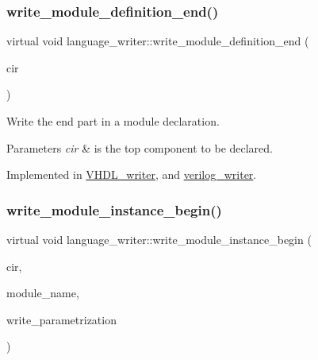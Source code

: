 \subsubsection{\texorpdfstring{write\+\_\+module\+\_\+definition\+\_\+end()}{write\_module\_definition\_end()}}
{\footnotesize\ttfamily virtual void language\+\_\+writer\+::write\+\_\+module\+\_\+definition\+\_\+end (\begin{DoxyParamCaption}\item[{const \hyperlink{structural__objects_8hpp_a8ea5f8cc50ab8f4c31e2751074ff60b2}{structural\+\_\+object\+Ref} \&}]{cir }\end{DoxyParamCaption})\hspace{0.3cm}{\ttfamily [pure virtual]}}



Write the end part in a module declaration. 


\begin{DoxyParams}{Parameters}
{\em cir} & is the top component to be declared. \\
\hline
\end{DoxyParams}


Implemented in \hyperlink{structVHDL__writer_af09ad7bcc11cb6cbcc0d92957db60283}{V\+H\+D\+L\+\_\+writer}, and \hyperlink{classverilog__writer_aeb32328c5b805c13c4fc86a5576e82d4}{verilog\+\_\+writer}.

\mbox{\label{classlanguage__writer_a9fa5dba07a53f84fb2936c0c46a511a4}} 
\subsubsection{\texorpdfstring{write\+\_\+module\+\_\+instance\+\_\+begin()}{write\_module\_instance\_begin()}}
{\footnotesize\ttfamily virtual void language\+\_\+writer\+::write\+\_\+module\+\_\+instance\+\_\+begin (\begin{DoxyParamCaption}\item[{const \hyperlink{structural__objects_8hpp_a8ea5f8cc50ab8f4c31e2751074ff60b2}{structural\+\_\+object\+Ref} \&}]{cir,  }\item[{const std\+::string \&}]{module\+\_\+name,  }\item[{bool}]{write\+\_\+parametrization }\end{DoxyParamCaption})\hspace{0.3cm}{\ttfamily [pure virtual]}}



